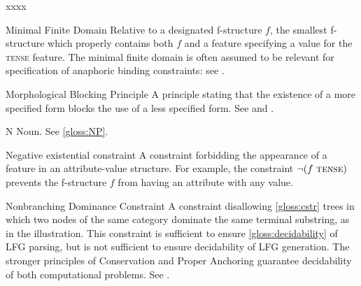 \documentclass[output=paper,colorlinks,citecolor=brown]{langscibook}
\begin{document}
\begin{labeling}{xxxx}
\item[Minimal Finite Domain] Relative to a designated f-structure $f$, the smallest f-structure which properly contains both $f$ and a feature specifying a value for the \textsc{tense} feature.  The minimal finite domain is often assumed to be relevant for specification of anaphoric binding constraints: see .

\item[Morphological Blocking Principle] A principle stating that the existence of a more specified form blocks the use of a less specified form.  See  and .

\item[N] Noun. See \ref{gloss:NP}.

\item[Negative existential constraint] A constraint forbidding the appearance of a feature in an attribute-value structure.  For example, the constraint $\neg(f~\textsc{tense}{})$ prevents the f-structure $f$ from having an attribute \TENSE with any value.

\item[Nonbranching Dominance Constraint\namedlabel{gloss:NBD}{Nonbranching Dominance Constraint}] A constraint disallowing \ref{gloss:cstr} trees in which two nodes of the same category dominate the same terminal substring, as in the illustration. This constraint is sufficient to ensure \ref{gloss:decidability} of LFG parsing, but is not sufficient to ensure decidability of LFG generation.  The stronger principles of Conservation and Proper Anchoring guarantee decidability of both computational problems.  See .
\end{labeling}
\end{document}
